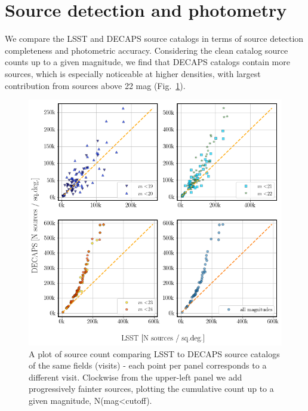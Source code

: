 \documentclass[DM,lsstdraft,toc,usenatbib]{lsstdoc}
\begin{document}

\section{Source detection and photometry}
\label{sec:metrics}

We compare the LSST and DECAPS source catalogs in terms of source detection completeness and photometric accuracy. Considering the clean catalog source counts up to a given magnitude, we find that DECAPS catalogs contain more sources, which is especially noticeable at higher densities, with largest contribution from sources above 22 mag (Fig.~\ref{fig:lsst_count_comparison}). 


\begin{figure}
\begin{centering}
\includegraphics[width=0.9\columnwidth]{figs/decaps_lsst_source_count.png}
\caption{A plot of source count comparing LSST to DECAPS source catalogs of the same fields (visits) -  each point per panel corresponds to a different visit. Clockwise from the upper-left panel we add progressively fainter sources, plotting the cumulative count up to a given magnitude, N(mag<cutoff).}
\label{fig:lsst_count_comparison}
\end{centering}
\end{figure} 
\end{document}
